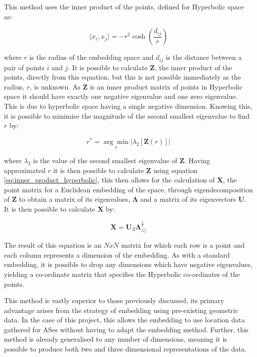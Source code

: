 This method uses the inner product of the points, defined for Hyperbolic space as: 

\begin{equation}
\label{eq:inner_product_hyperbolic}
\langle x_i,x_j\rangle = -r^2\cosh \left(\frac{d_{ij}}{r}\right)
\end{equation}

where $r$ is the radius of the embedding space and $d_{ij}$ is the distance between a pair of points $i$ and $j$. It is possible to calculate $\boldsymbol{Z}$, the inner product of the points, directly from this equation, but this is not possible immediately as the radius, $r$, is unknown. As $\boldsymbol{Z}$ is an inner product matrix of points in Hyperbolic space it should have exactly one negative eigenvalue and one zero eigenvalue. This is due to hyperbolic space having a single negative dimension. Knowing this, it is possible to minimise the magnitude of the second smallest eigenvalue to find $r$ by:

\begin{equation}
\label{eq:argmin_hyperbolic}
r^*=\underset{r}{\arg\min}|\lambda_2[\boldsymbol{Z}(r)]|
\end{equation}

where $\lambda_2$ is the value of the second smallest eigenvalue of $\boldsymbol{Z}$. Having approximated $r$ it is then possible to calculate $\boldsymbol{Z}$ using equation \ref{eq:inner_product_hyperbolic}, this then allows for the calculation of $\boldsymbol{X}$, the point matrix for a Euclidean embedding of the space, through eigendecomposition of $\boldsymbol{Z}$ to obtain a matrix of its eigenvalues, $\boldsymbol{\Lambda}$ and a matrix of its eigenvectors $\boldsymbol{U}$. It is then possible to calculate $\boldsymbol{X}$ by:

\begin{equation}
\label{eq:embedding_x}
\boldsymbol{X}=\boldsymbol{U}_Z\boldsymbol{\Lambda}_{z||}^{\frac{1}{2}}
\end{equation}

The result of this equation is an $NxN$ matrix for which each row is a point and each column represents a dimension of the embedding. As with a standard embedding, it is possible to drop any dimensions which have negative eigenvalues, yielding a co-ordinate matrix that specifies the Hyperbolic co-ordinates of the points.

This method is vastly superior to those previously discussed, its primary advantage arises from the strategy of embedding using pre-existing geometric data. In the case of this project, this allows the embedding to use location data gathered for ASes without having to adapt the embedding method. Further, this method is already generalised to any number of dimensions, meaning it is possible to produce both two and three dimensional representations of the data. 

